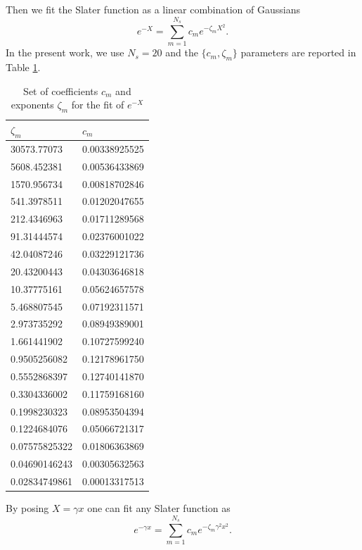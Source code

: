 \documentclass[aip,jcp,reprint,noshowkeys,superscriptaddress,twocolumn]{revtex4-1}
\begin{document}
Then we fit the Slater function as a linear combination of Gaussians 
\begin{equation}
 e^{-X} = \sum_{m=1}^{N_s} c_m e^{-\zeta_m X^2}. 
\end{equation}
In the present work, we use $N_s=20$ and the $\{c_m,\zeta_m\}$ parameters are reported in Table \ref{gauss_fit}.
\begin{table}
\label{gauss_fit}
\caption{Set of coefficients $c_m$ and exponents $\zeta_m$ for the fit of $e^{-X}$}
\begin{ruledtabular}
\begin{tabular}{ll}
 $\zeta_m$ & $c_m$ \\
\hline                 
   30573.77073         & 0.00338925525  \\
   5608.452381         & 0.00536433869  \\
   1570.956734         & 0.00818702846  \\
   541.3978511         & 0.01202047655  \\
   212.4346963         & 0.01711289568  \\
   91.31444574         & 0.02376001022  \\
   42.04087246         & 0.03229121736  \\
   20.43200443         & 0.04303646818  \\
   10.37775161         & 0.05624657578  \\
   5.468807545         & 0.07192311571  \\
   2.973735292         & 0.08949389001  \\
   1.661441902         & 0.10727599240  \\
   0.9505256082        & 0.12178961750  \\
   0.5552868397        & 0.12740141870  \\
   0.3304336002        & 0.11759168160  \\
   0.1998230323        & 0.08953504394  \\
   0.1224684076        & 0.05066721317  \\
   0.07575825322       & 0.01806363869  \\
   0.04690146243       & 0.00305632563  \\
   0.02834749861       & 0.00013317513  \\
\end{tabular}
\end{ruledtabular}
\end{table}
By posing $X=\gamma x$ one can fit any Slater function as
\begin{equation}
 e^{-\gamma x} = \sum_{m=1}^{N_s} c_m e^{-\zeta_m \gamma^2 x^2}. 
\end{equation}
\end{document}
